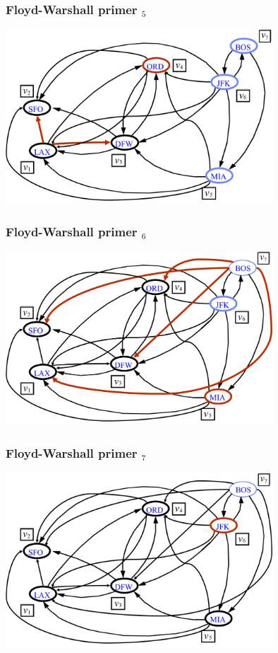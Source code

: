 \documentclass[compress,aspectratio=169]{beamer}
\begin{document}
\begin{frame}[fragile]
  \frametitle{Floyd-Warshall primer $_5$}
  \begin{center}
    \includegraphics[width=10cm]{asp-14-pic41.png}
  \end{center}
\end{frame}

\begin{frame}[fragile]
  \frametitle{Floyd-Warshall primer $_6$}
  \begin{center}
    \includegraphics[width=10cm]{asp-14-pic42.png}
  \end{center}
\end{frame}

\begin{frame}[fragile]
  \frametitle{Floyd-Warshall primer $_7$}
  \begin{center}
    \includegraphics[width=10cm]{asp-14-pic43.png}
  \end{center}
\end{frame}
\end{document}
